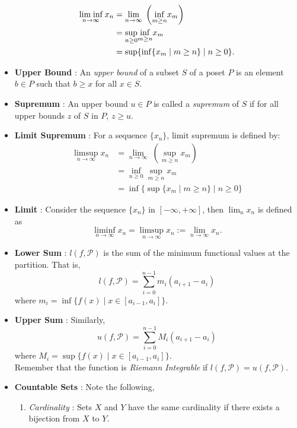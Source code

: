 \documentclass{article}
\theoremstyle{definition}
\theoremstyle{remark}
\theoremstyle{definition}
\theoremstyle{definition}
\theoremstyle{definition}
\newcommand{\lsum}[2]{l(#1,\mathcal{#2})}
\newcommand{\usum}[2]{u(#1,\mathcal{#2})}
\newcommand{\where}{\;\vert\;}
\newcommand{\limit}[2]{\underset{#1}{\lim}\; #2}
\newcommand{\limitinf}[1]{\underset{#1}{\text{lim\;inf}}}
\newcommand{\infim}[1]{\underset{#1}{\inf}}
\newcommand{\suprem}[1]{\underset{#1}{\sup}}
\begin{document}
\begin{itemize}
{\begin{equation}
	\begin{split}
	\limitinf{n\to\infty}\; x_n &= \limit{n\to \infty}{\left ( \infim{m\ge n} x_m \right )}\\
	&= \suprem{n\ge 0} \infim{m\ge n} x_m\\
	 &= \sup \{\inf\{x_m \where m\ge n\}\where n\ge 0\}.
	\end{split}
\end{equation}
}
	\item {\textbf{Upper Bound} : An \emph{upper bound} of a subset $ S $ of a poset $  P$ is an element $ b\in P $ such that $ b\ge x $ for all $ x\in S $.}
	\item {\textbf{Supremum} : An upper bound $ u\in P $ is called a \emph{supremum} of $ S $ if for all upper bounds $ z $ of $ S $ in $ P $, $ z \ge u $.}
	\item {\textbf{Limit Supremum} :  For a sequence $ \{x_n\} $, limit supremum is defined by:
	\begin{equation}\label{limsup}
		\begin{split}
			\limsup_{n\to \infty} x_n &= \limit{n\to \infty}{\left (\sup_{m\ge n} x_m\right )}\\
			&= \inf_{n\ge 0} \sup_{m\ge n} x_m\\
			&= \inf \{\sup\{x_m \where m\ge n\}\where n\ge 0\}
		\end{split}
	\end{equation}}
\item {\textbf{Limit} : Consider the sequence $ \{x_n\} $ in $ [-\infty,+\infty] $, then $ \lim_{n} x_n $ is defined as
	\[\liminf_{n\to \infty} x_n = \limsup_{n\to\infty}x_n := \lim_{n\to \infty} x_n.\]
}
	\item {\textbf{Lower Sum} : $ l(f,\mathcal{P}) $ is the sum of the minimum functional values at the partition. That is,
		\[\lsum{f}{P} = \sum_{i=0}^{n-1} m_i (a_{i+1} - a_i)\]
		where $ m_i = \inf\{f(x)\;\vert\;x\in [a_{i-1},a_i]\}$.}
	\item {\textbf{Upper Sum} : Similarly,
		\[\usum{f}{P} = \sum_{i=0}^{n-1} M_i (a_{i+1} - a_i)\]
		where $ M_i = \sup\{f(x)\where x\in [a_{i-1},a_i] \} $.\\
		Remember that the function is \emph{Riemann Integrable} if $ l(f,\mathcal{P}) = u(f,\mathcal{P}) $.}
	\item{\textbf{Countable Sets} : Note the following,
\begin{enumerate}
	\item{\emph{Cardinality} : Sets $ X $ and $ Y $ have the same cardinality if there exists a bijection from $ X $ to $ Y $.}

\end{enumerate}}
\end{itemize}
\end{document}
